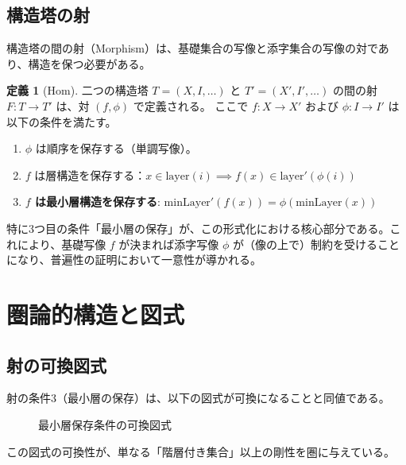 \documentclass[a4paper,11pt]{article}
\theoremstyle{definition}
\newtheorem{definition}{定義}[section]
\theoremstyle{plain}
\begin{document}
\subsection{構造塔の射}

構造塔の間の射（Morphism）は、基礎集合の写像と添字集合の写像の対であり、構造を保つ必要がある。

\begin{definition}[Hom]
二つの構造塔 $T = (X, I, \dots)$ と $T' = (X', I', \dots)$ の間の射 $F: T \to T'$ は、対 $(f, \phi)$ で定義される。
ここで $f: X \to X'$ および $\phi: I \to I'$ は以下の条件を満たす。
\begin{enumerate}
    \item $\phi$ は順序を保存する（単調写像）。
    \item $f$ は層構造を保存する：$x \in \mathrm{layer}(i) \implies f(x) \in \mathrm{layer}'(\phi(i))$
    \item \textbf{$f$ は最小層構造を保存する}: $\mathrm{minLayer}'(f(x)) = \phi(\mathrm{minLayer}(x))$
\end{enumerate}
\end{definition}

特に3つ目の条件「最小層の保存」が、この形式化における核心部分である。これにより、基礎写像 $f$ が決まれば添字写像 $\phi$ が（像の上で）制約を受けることになり、普遍性の証明において一意性が導かれる。

\section{圏論的構造と図式}

\subsection{射の可換図式}

射の条件3（最小層の保存）は、以下の図式が可換になることと同値である。

\begin{figure}[htbp]
\centering
{}
\caption{最小層保存条件の可換図式}
\end{figure}

この図式の可換性が、単なる「階層付き集合」以上の剛性を圏に与えている。
\end{document}
